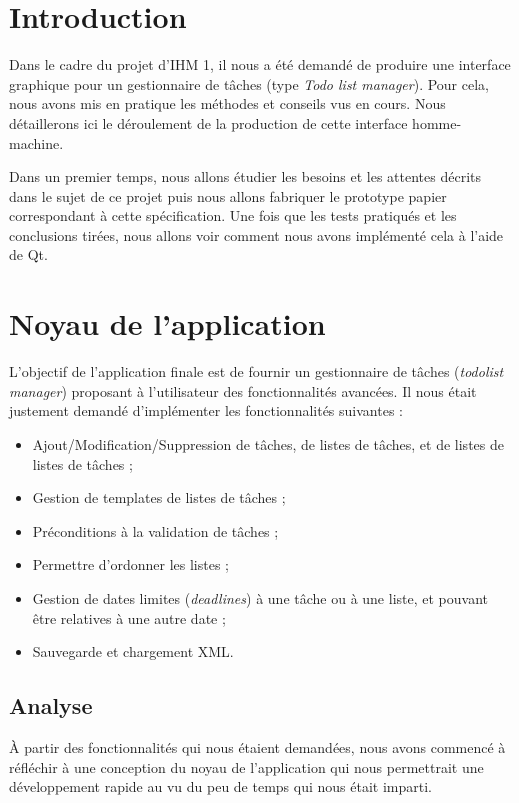 \chapter*{Introduction}
	Dans le cadre du projet d'IHM 1, il nous a été demandé de produire une interface graphique pour un gestionnaire de tâches (type \emph{Todo list manager}). Pour cela, nous avons mis en pratique les méthodes et conseils vus en cours. Nous détaillerons ici le déroulement de la production de cette interface homme-machine.
	
	Dans un premier temps, nous allons étudier les besoins et les attentes décrits dans le sujet de ce projet puis nous allons fabriquer le prototype papier correspondant à cette spécification. Une fois que les tests pratiqués et les conclusions tirées, nous allons voir comment nous avons implémenté cela à l'aide de Qt.

\chapter{Noyau de l'application}

	L'objectif de l'application finale est de fournir un gestionnaire de tâches (\emph{todolist manager}) proposant à l'utilisateur des fonctionnalités avancées. Il nous était justement demandé d'implémenter les fonctionnalités suivantes :
	\begin{itemize}
		\item Ajout/Modification/Suppression de tâches, de listes de tâches, et de listes de listes de tâches ;
		\item Gestion de templates de listes de tâches ;
		\item Préconditions à la validation de tâches ;
		\item Permettre d'ordonner les listes ;
		\item Gestion de dates limites (\emph{deadlines}) à une tâche ou à une liste, et pouvant être relatives à une autre date ;
		\item Sauvegarde et chargement XML.
	\end{itemize}

	\section{Analyse}
	
		À partir des fonctionnalités qui nous étaient demandées, nous avons commencé à réfléchir à une conception du noyau de l'application qui nous permettrait une développement rapide au vu du peu de temps qui nous était imparti.\\
		
